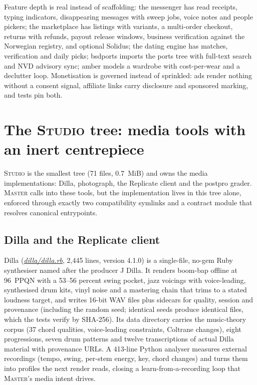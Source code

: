 \documentclass[oneside]{article}
\newcommand{\treename}[1]{\mbox{\textsc{#1}}}
\newcommand{\mtree}{\treename{Master}}
\newcommand{\stree}{\treename{Studio}}
\newcommand{\fpath}[1]{\emph{\url{#1}}}
\begin{document}
Feature depth is real instead of scaffolding: the messenger has read receipts, typing indicators, disappearing messages with sweep jobs, voice notes and people pickers; the marketplace has listings with variants, a multi-order checkout, returns with refunds, payout release windows, business verification against the Norwegian registry, and optional Solidus; the dating engine has matches, verification and daily picks; bsdports imports the ports tree with full-text search and NVD advisory sync; amber models a wardrobe with cost-per-wear and a declutter loop. Monetisation is governed instead of sprinkled: ads render nothing without a consent signal, affiliate links carry disclosure and sponsored marking, and tests pin both.

\section{The \stree{} tree: media tools with an inert centrepiece}

\stree{} is the smallest tree (71 files, 0.7~MiB) and owns the media implementations: Dilla, photograph, the Replicate client and the postpro grader. \mtree{} calls into these tools, but the implementation lives in this tree alone, enforced through exactly two compatibility symlinks and a contract module that resolves canonical entrypoints.

\subsection{Dilla and the Replicate client}

Dilla (\fpath{dilla/dilla.rb}, 2,445 lines, version 4.1.0) is a single-file, no-gem Ruby synthesiser named after the producer J Dilla. It renders boom-bap offline at 96~PPQN with a 53--56 percent swing pocket, jazz voicings with voice-leading, synthesised drum kits, vinyl noise and a mastering chain that trims to a stated loudness target, and writes 16-bit WAV files plus sidecars for quality, session and provenance (including the random seed; identical seeds produce identical files, which the tests verify by SHA-256). Its data directory carries the music-theory corpus (37 chord qualities, voice-leading constraints, Coltrane changes), eight progressions, seven drum patterns and twelve transcriptions of actual Dilla material with provenance URLs. A 413-line Python analyser measures external recordings (tempo, swing, per-stem energy, key, chord changes) and turns them into profiles the next render reads, closing a learn-from-a-recording loop that \mtree's media intent drives.
\end{document}

